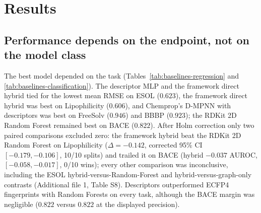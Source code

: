 \section{Results}\label{sec:results}

\subsection{Performance depends on the endpoint, not on the model class}\label{subsec:cross-task-results}

The best model depended on the task (Tables~\ref{tab:baselines-regression} and \ref{tab:baselines-classification}). The descriptor MLP and the framework direct hybrid tied for the lowest mean RMSE on ESOL ($0.623$), the framework direct hybrid was best on Lipophilicity ($0.606$), and Chemprop's D-MPNN with descriptors was best on FreeSolv ($0.946$) and BBBP ($0.923$); the RDKit 2D Random Forest remained best on BACE ($0.822$). After Holm correction only two paired comparisons excluded zero: the framework hybrid beat the RDKit 2D Random Forest on Lipophilicity ($\Delta=-0.142$, corrected 95\% CI $[-0.179,-0.106]$, 10/10 splits) and trailed it on BACE (hybrid $-0.037$ AUROC, $[-0.058,-0.017]$, 0/10 wins); every other comparison was inconclusive, including the ESOL hybrid-versus-Random-Forest and hybrid-versus-graph-only contrasts (Additional file 1, Table S8). Descriptors outperformed ECFP4 fingerprints with Random Forests on every task, although the BACE margin was negligible ($0.822$ versus $0.822$ at the displayed precision).

